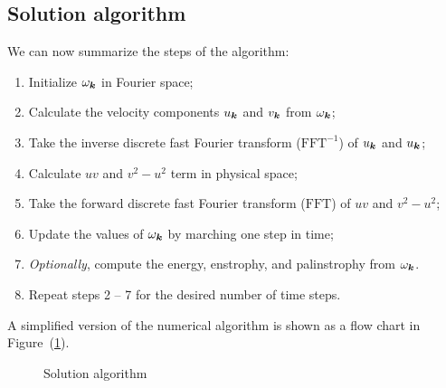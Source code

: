 \documentclass[12pt]{article}
\begin{document}
\subsection{Solution algorithm}
We can now summarize the steps of the algorithm:
\begin{enumerate}
\item Initialize $\omega_{{\bm k}}$ in Fourier space;
\item Calculate the velocity components $u_{\bm k}$ and $v_{\bm k}$ from $\omega_{{\bm k}}$;
\item Take the inverse discrete fast Fourier transform
  ($\text{FFT}^{-1}$) of $u_{\bm k}$ and $u_{\bm k}$;
\item Calculate $uv$ and $v^2-u^2$ term in physical space;
\item Take the forward discrete fast Fourier transform ($\text{FFT}$) of
$uv$ and $v^2-u^2$;
\item Update the values of $\omega_{\bm k}$ by marching one step in time;
\item \emph{Optionally}, compute the energy, enstrophy, and palinstrophy from $\omega_{\bm k}$.
\item Repeat steps 2 -- 7 for the desired number of time steps.
\end{enumerate}
A simplified version of the numerical algorithm is shown as a flow chart in Figure~(\ref{algorithm}).

\begin{figure}[ht]
\begin{center}
\caption{Solution algorithm}\label{algorithm}
\end{center}
\end{figure}

\hypertarget{Bibliography}{}


\end{document}
